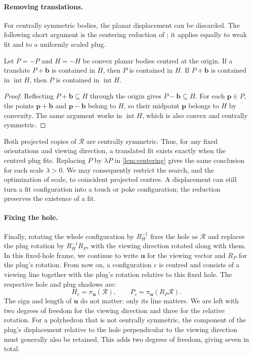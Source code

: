 \paragraph{Removing translations.}
For centrally symmetric bodies, the planar displacement can be discarded.
The following short argument is the centering reduction of
\citet[Proposition~2]{SteiningerYurkevich2023}; it applies equally to weak fit
and to a uniformly scaled plug.

\begin{lemma}[Centering]\label{lem:centering}
  Let $P=-P$ and $H=-H$ be convex planar bodies centred at the origin.
  If a translate $P+\mathbf b$ is contained in $H$, then $P$ is contained in $H$.
  If $P+\mathbf b$ is contained in $\operatorname{int}H$, then $P$ is contained in
  $\operatorname{int}H$.
\end{lemma}
\begin{proof}
  Reflecting $P+\mathbf b\subseteq H$ through the origin gives $P-\mathbf b\subseteq H$.
  For each $\mathbf p\in P$, the points $\mathbf p+\mathbf b$ and $\mathbf p-\mathbf b$ belong to $H$, so their
  midpoint $\mathbf p$ belongs to $H$ by convexity. The same argument works in
  $\operatorname{int}H$, which is also convex and centrally symmetric.
\end{proof}

Both projected copies of $\mathcal R$ are centrally symmetric. Thus, for any fixed
orientations and viewing direction, a translated fit exists exactly when
the centred plug fits. Replacing $P$ by $\lambda P$ in
\cref{lem:centering} gives the same conclusion for each scale $\lambda>0$.
We may consequently restrict the search, and the optimization of scale, to
coincident projected centres. A displacement can still turn a fit configuration
into a touch or poke configuration; the reduction preserves the
existence of a fit.

\paragraph{Fixing the hole.}
Finally, rotating the whole configuration by $R_{H}^{-1}$ fixes the hole as $\mathcal R$
and replaces the plug rotation by $R_{H}^{-1}R_{P}$, with the viewing direction
rotated along with them. In this fixed-hole frame, we continue to write
$\mathbf u$ for the viewing vector and $R_{P}$ for the plug's rotation.
From now on, a configuration $c$ is centred and
consists of a viewing line together with the plug's rotation relative to
this fixed hole. The respective hole and plug shadows are:
\[
  H_c=\pi_{\mathbf u}(\mathcal R),\qquad P_c=\pi_{\mathbf u}(R_{P}\mathcal R).
\]
The sign and length of $\mathbf u$ do not matter: only its line matters. We are left
with two degrees of freedom for the viewing direction and three for the
relative rotation. For a polyhedron that is not centrally symmetric, the
component of the plug's displacement relative to the hole perpendicular
to the viewing direction must generally also be retained. This adds two
degrees of freedom, giving seven in total.

